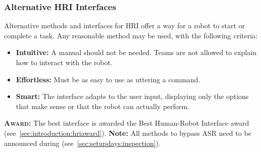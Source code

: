 \subsubsection{Alternative HRI Interfaces}
\label{sec:rules:asrcontinue:hriinterface}
Alternative methods and interfaces for HRI offer a way for a robot to start or complete a task.
Any reasonable method may be used, with the following criteria:
\begin{itemize}
	\item \textbf{Intuitive:} A manual should not be needed. Teams are not allowed to explain how to interact with the robot.

	\item \textbf{Effortless:} Must be as easy to use as uttering a command.

	\item \textbf{Smart:} The interface adapts to the user input, displaying only the options that make sense or that the robot can actually perform.
\end{itemize}
\noindent\textbf{\textsc{Award:}} The best interface is awarded the Best Human-Robot Interface award (see~\ref{sec:introduction:hriaward}).
\noindent\textbf{Note:} All methods to bypass ASR need to be announced during \RobotInspection{} (see~\ref{sec:setupdays:inspection}).

